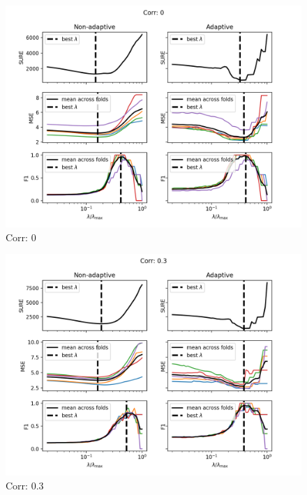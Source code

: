 \begin{figure}[h]
    \centering
    \includegraphics[]{../srcimages/sure_vs_mse_corr_0.png}
    \caption{Corr: 0}
    \label{fig:sure_vs_mse_corr_0}
\end{figure}

\begin{figure}[h]
    \centering
    \includegraphics[]{../srcimages/sure_vs_mse_corr_30.png}
    \caption{Corr: 0.3}
    \label{fig:sure_vs_mse_corr_30}
\end{figure}

